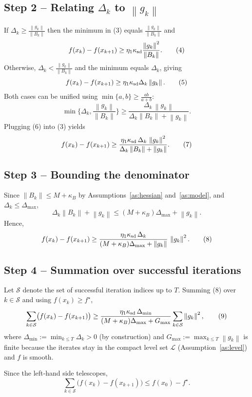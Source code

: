 \documentclass[11pt]{article}
\newcommand{\norm}[1]{\left\lVert#1\right\rVert}
\begin{document}
\subsection*{Step 2 – Relating $\Delta_{k}$ to $\norm{g_{k}}$}
If $\Delta_{k}\ge \frac{\norm{g_{k}}}{\norm{B_{k}}}$ then the minimum in (3) equals $\frac{\norm{g_{k}}}{\norm{B_{k}}}$ and
\[
f(x_{k})-f(x_{k+1})\ge\eta_{1}\kappa_{\rm sd}\frac{\norm{g_{k}}^{2}}{\norm{B_{k}}}. \tag{4}
\]
Otherwise, $\Delta_{k}<\frac{\norm{g_{k}}}{\norm{B_{k}}}$ and the minimum equals $\Delta_{k}$, giving
\[
f(x_{k})-f(x_{k+1})\ge\eta_{1}\kappa_{\rm sd}\Delta_{k}\norm{g_{k}}. \tag{5}
\]
Both cases can be unified using $\min\{a,b\}\ge\frac{ab}{a+b}$:
\[
\min\!\Big\{\Delta_{k},\frac{\norm{g_{k}}}{\norm{B_{k}}}\Big\}
\ge\frac{\Delta_{k}\,\norm{g_{k}}}{\Delta_{k}\norm{B_{k}}+\norm{g_{k}}}. \tag{6}
\]
Plugging (6) into (3) yields
\[
f(x_{k})-f(x_{k+1})\ge
\frac{\eta_{1}\kappa_{\rm sd}\,\Delta_{k}\,\norm{g_{k}}^{2}}{\Delta_{k}\norm{B_{k}}+\norm{g_{k}}}. \tag{7}
\]

\subsection*{Step 3 – Bounding the denominator}
Since $\norm{B_{k}}\le M+\kappa_{B}$ by Assumptions~\ref{as:hessian} and~\ref{as:model}, and $\Delta_{k}\le\Delta_{\max}$,
\[
\Delta_{k}\norm{B_{k}}+\norm{g_{k}}\le (M+\kappa_{B})\Delta_{\max}+\norm{g_{k}}.
\]
Hence,
\[
f(x_{k})-f(x_{k+1})\ge
\frac{\eta_{1}\kappa_{\rm sd}\,\Delta_{k}}{(M+\kappa_{B})\Delta_{\max}+ \norm{g_{k}}}\,\norm{g_{k}}^{2}. \tag{8}
\]

\subsection*{Step 4 – Summation over successful iterations}
Let $\mathcal{S}$ denote the set of successful iteration indices up to $T$.
Summing (8) over $k\in\mathcal{S}$ and using $f(x_{k})\ge f^{\star}$,
\[
\sum_{k\in\mathcal{S}}\bigl(f(x_{k})-f(x_{k+1})\bigr)
\ge
\frac{\eta_{1}\kappa_{\rm sd}\,\Delta_{\min}}{(M+\kappa_{B})\Delta_{\max}+G_{\max}}
\sum_{k\in\mathcal{S}}\norm{g_{k}}^{2}, \tag{9}
\]
where $\Delta_{\min}:=\min_{k\le T}\Delta_{k}>0$ (by construction) and $G_{\max}:=\max_{k\le T}\norm{g_{k}}$ is finite because the iterates stay in the compact level set $\mathcal{L}$ (Assumption~\ref{as:level}) and $f$ is smooth.

Since the left‑hand side telescopes,
\[
\sum_{k\in\mathcal{S}}\bigl(f(x_{k})-f(x_{k+1})\bigr)
\le f(x_{0})-f^{\star}. \tag{10}
\]
\end{document}
